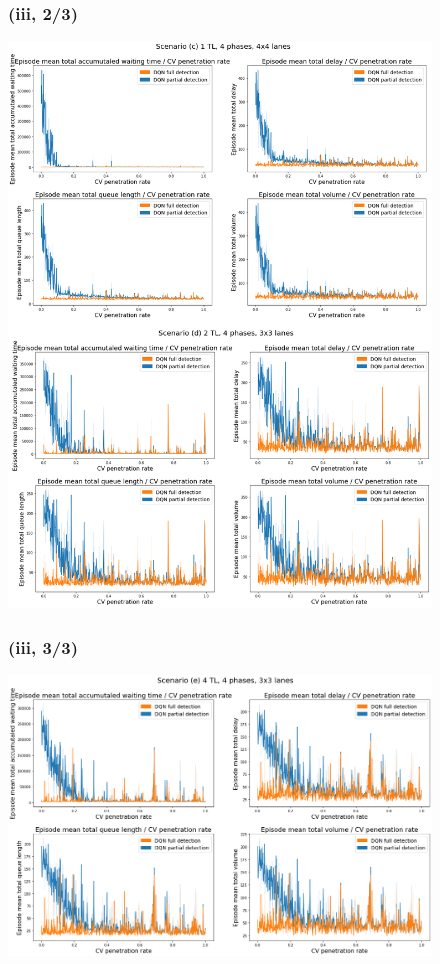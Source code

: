 \begin{figure}[h]
\subsubsection*{(iii, 2/3)}
\includegraphics[width=\textwidth]{img/Appendix/3_3-4.png}
\centering
\end{figure}
\restoregeometry

\pagebreak

\begin{figure}[h]
\subsubsection*{(iii, 3/3)}
\includegraphics[width=\textwidth]{img/Appendix/3_5.png}
\centering
\end{figure}
